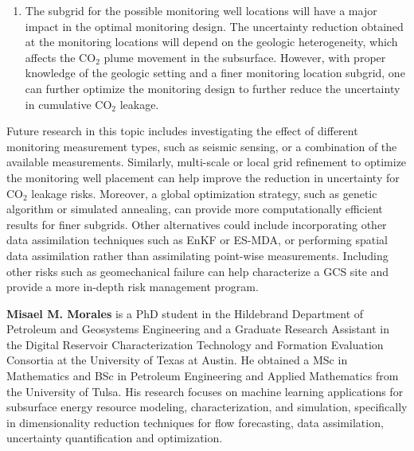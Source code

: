 \documentclass[a4paper,fleqn]{cas-sc}
\begin{document}
\begin{enumerate}
    \item The subgrid for the possible monitoring well locations will have a major impact in the optimal monitoring design. The uncertainty reduction obtained at the monitoring locations will depend on the geologic heterogeneity, which affects the CO$_2$ plume movement in the subsurface. However, with proper knowledge of the geologic setting and a finer monitoring location subgrid, one can further optimize the monitoring design to further reduce the uncertainty in cumulative CO$_2$ leakage.
\end{enumerate}

Future research in this topic includes investigating the effect of different monitoring measurement types, such as seismic sensing, or a combination of the available measurements. Similarly, multi-scale or local grid refinement to optimize the monitoring well placement can help improve the reduction in uncertainty for CO$_2$ leakage risks. Moreover, a global optimization strategy, such as genetic algorithm or simulated annealing, can provide more computationally efficient results for finer subgrids. Other alternatives could include incorporating other data assimilation techniques such as EnKF or ES-MDA, or performing spatial data assimilation rather than assimilating point-wise measurements. Including other risks such as geomechanical failure can help characterize a GCS site and provide a more in-depth risk management program. 






\bio{}
{\bf Misael M. Morales} is a PhD student in the Hildebrand Department of Petroleum and Geosystems Engineering and a Graduate Research Assistant in the Digital Reservoir Characterization Technology and Formation Evaluation Consortia at the University of Texas at Austin. He obtained a MSc in Mathematics and BSc in Petroleum Engineering and Applied Mathematics from the University of Tulsa. His research focuses on machine learning applications for subsurface energy resource modeling, characterization, and simulation, specifically in dimensionality reduction techniques for flow forecasting, data assimilation, uncertainty quantification and optimization. 
\end{document}
